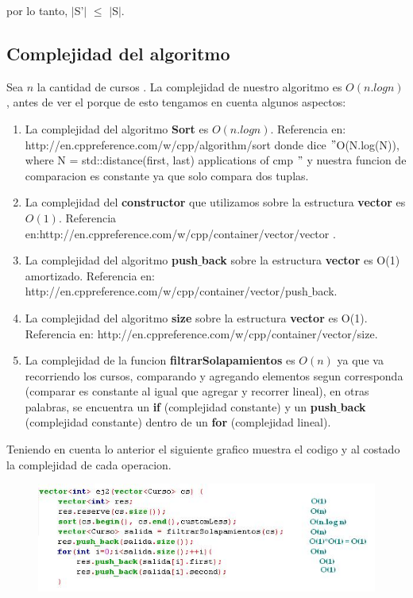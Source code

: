 por lo tanto, $|$S'$|$ $\leq$ $|$S$|$. 


\subsection{Complejidad del algoritmo}

Sea $n$ la cantidad de cursos . La complejidad de nuestro algoritmo es $O(n.log n)$, antes de ver el porque de esto tengamos en cuenta algunos aspectos:
\begin{enumerate}
\item La complejidad del algoritmo \textbf{Sort} es $O(n.log n)$. Referencia en: http://en.cppreference.com/w/cpp/algorithm/sort donde dice $"$O(N.log(N)), where N = std::distance(first, last) applications of cmp $"$ y nuestra funcion de comparacion es constante ya que solo compara dos tuplas.
\item La complejidad del \textbf{constructor} que utilizamos sobre la estructura \textbf{vector} es $O(1)$. Referencia en:http://en.cppreference.com/w/cpp/container/vector/vector .
\item La complejidad del algoritmo \textbf{push$\_$back} sobre la estructura \textbf{vector} es O(1) amortizado. Referencia en: http://en.cppreference.com/w/cpp/container/vector/push$\_$back. 
\item La complejidad del algoritmo \textbf{size} sobre la estructura \textbf{vector} es O(1). Referencia en: http://en.cppreference.com/w/cpp/container/vector/size.
\item La complejidad de la funcion \textbf{filtrarSolapamientos} es $O(n)$ ya que va recorriendo los cursos, comparando y agregando elementos segun corresponda (comparar es constante al igual que agregar y recorrer lineal), en otras palabras, se encuentra un \textbf{if} (complejidad constante) y un \textbf{push$\_$back} (complejidad constante) dentro de un \textbf{for} (complejidad lineal). 
\end{enumerate}
Teniendo en cuenta lo anterior el siguiente grafico muestra el codigo y al costado la complejidad de cada operacion.

\begin{figure}[H] %
\begin{center}
\includegraphics[]{../imgs/comple2.jpg}
\end{center}
\end{figure}

